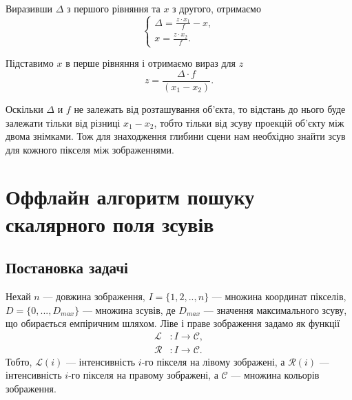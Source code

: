 Виразивши $\Delta$ з першого рівняння та $x$ з другого, отримаємо
$$\begin{cases} \Delta = \frac{z \cdot x_1}{f} - x , \\ x = \frac{z \cdot x_2}{f} . \end{cases}$$
	
Підставимо $x$ в перше рівняння і отримаємо вираз для $z$
$$ z = \frac{\Delta \cdot f}{(x_1 - x_2)} .$$
	
Оскільки $\Delta$ и $f$ не залежать від розташування об'єкта, то відстань до нього буде залежати тільки від різниці $x_1 - x_2$, тобто тільки від зсуву проекцій об'єкту між двома знімками. Тож для знаходження глибини сцени нам необхідно знайти зсув для кожного пікселя між зображеннями.
	


\section{Оффлайн алгоритм пошуку скалярного поля зсувів}\label{offline}
\subsection{Постановка задачі}
Нехай $n$ --- довжина зображення, $I = \{1, 2, .., n\}$ --- множина координат пікселів, $D = \{0, ... , D_{max}\}$ ---  множина зсувів, де $D_{max}$ --- значення максимального зсуву, що обирається емпіричним шляхом. 
Ліве і праве зображення задамо як функції
\begin{align*}
	\mathcal{L} &: I \rightarrow \mathcal{C} , \\
	\mathcal{R} &: I \rightarrow \mathcal{C} .
\end{align*}
Тобто, $\mathcal{L}(i)$ --- інтенсивність $i$-го пікселя на лівому зображені, а $\mathcal{R}(i)$ --- інтенсивність $i$-го пікселя на правому зображені, а $ \mathcal{C} $ --- множина кольорів зображення.

